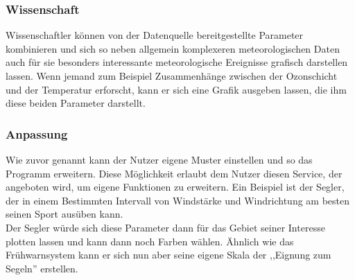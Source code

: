 \subsubsection{Wissenschaft} %
Wissenschaftler können von der Datenquelle bereitgestellte Parameter kombinieren
und sich so neben allgemein komplexeren meteorologischen Daten
auch für sie besonders interessante meteorologische Ereignisse grafisch darstellen lassen.
Wenn jemand zum Beispiel Zusammenhänge zwischen der Ozonschicht und der Temperatur erforscht,
kann er sich eine Grafik ausgeben lassen, die ihm diese beiden Parameter darstellt.

\subsubsection{Anpassung} %
Wie zuvor genannt kann der Nutzer eigene Muster einstellen und so das Programm erweitern.
Diese Möglichkeit erlaubt dem Nutzer diesen Service,
der angeboten wird, um eigene Funktionen zu erweitern.
Ein Beispiel ist der Segler, der in einem Bestimmten
Intervall von Windstärke und Windrichtung am besten seinen Sport ausüben kann.\\
Der Segler würde sich diese Parameter dann für das Gebiet seiner
Interesse plotten lassen und kann dann noch Farben wählen.
Ähnlich wie das Frühwarnsystem kann er sich nun aber
seine eigene Skala der ,,Eignung zum Segeln'' erstellen.

